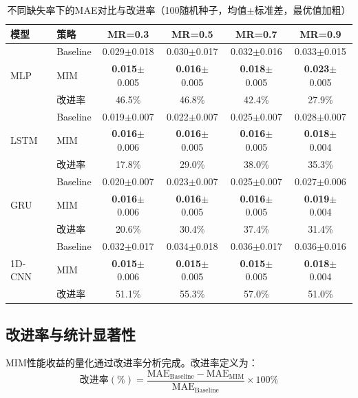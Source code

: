 \documentclass[10pt,a4paper]{ctexart}
\begin{document}
\begin{table}[!htbp]
\centering
\small
\caption{不同缺失率下的MAE对比与改进率（100随机种子，均值$\pm$标准差，最优值加粗）}
\label{tab:full_results}
\begin{tabular}{@{}llcccc@{}}
\toprule
\textbf{模型} & \textbf{策略} & \textbf{MR=0.3} & \textbf{MR=0.5} & \textbf{MR=0.7} & \textbf{MR=0.9} \\
\midrule
\multirow{3}{*}{MLP} 
& Baseline & 0.029$\pm$0.018 & 0.030$\pm$0.017 & 0.032$\pm$0.016 & 0.033$\pm$0.015 \\
& MIM & \textbf{0.015}$\pm$0.005 & \textbf{0.016}$\pm$0.005 & \textbf{0.018}$\pm$0.005 & \textbf{0.023}$\pm$0.005 \\
& 改进率 & 46.5\% & 46.8\% & 42.4\% & 27.9\% \\
\midrule
\multirow{3}{*}{LSTM} 
& Baseline & 0.019$\pm$0.007 & 0.022$\pm$0.007 & 0.025$\pm$0.007 & 0.028$\pm$0.007 \\
& MIM & \textbf{0.016}$\pm$0.006 & \textbf{0.016}$\pm$0.005 & \textbf{0.016}$\pm$0.005 & \textbf{0.018}$\pm$0.004 \\
& 改进率 & 17.8\% & 29.0\% & 38.0\% & 35.3\% \\
\midrule
\multirow{3}{*}{GRU} 
& Baseline & 0.020$\pm$0.007 & 0.023$\pm$0.007 & 0.025$\pm$0.007 & 0.027$\pm$0.006 \\
& MIM & \textbf{0.016}$\pm$0.006 & \textbf{0.016}$\pm$0.005 & \textbf{0.016}$\pm$0.005 & \textbf{0.019}$\pm$0.004 \\
& 改进率 & 20.6\% & 30.4\% & 37.4\% & 31.4\% \\
\midrule
\multirow{3}{*}{1D-CNN} 
& Baseline & 0.032$\pm$0.017 & 0.034$\pm$0.018 & 0.036$\pm$0.017 & 0.036$\pm$0.016 \\
& MIM & \textbf{0.015}$\pm$0.006 & \textbf{0.015}$\pm$0.005 & \textbf{0.015}$\pm$0.005 & \textbf{0.018}$\pm$0.004 \\
& 改进率 & 51.1\% & 55.3\% & 57.0\% & 51.0\% \\
\bottomrule
\end{tabular}
\end{table}

\subsection{改进率与统计显著性}\label{sec:improvement}

MIM性能收益的量化通过改进率分析完成。改进率定义为：
\begin{equation}
    \text{改进率}(\%) = \frac{\text{MAE}_{\text{Baseline}} - \text{MAE}_{\text{MIM}}}{\text{MAE}_{\text{Baseline}}} \times 100\%
\end{equation}
\end{document}
